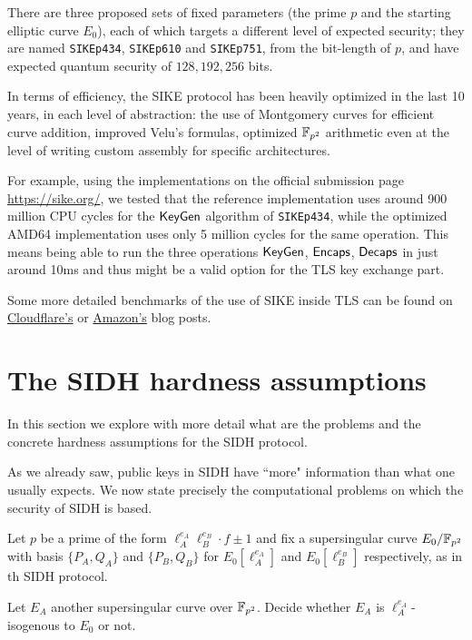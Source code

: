 There are three proposed sets of fixed parameters (the prime $p$ and the starting elliptic curve $E_0$), each of which targets a different level of expected security; they are named \texttt{SIKEp434}, \texttt{SIKEp610} and \texttt{SIKEp751}, from the bit-length of $p$, and have expected quantum security of $128, 192, 256$ bits.

In terms of efficiency, the SIKE protocol has been heavily optimized in the last 10 years, in each level of abstraction: the use of Montgomery curves for efficient curve addition, improved Velu's formulas, optimized $\mathbb{F}_{p^2}$ arithmetic even at the level of writing custom assembly for specific architectures.

For example, using the implementations on the official submission page \url{https://sike.org/},
we tested that the reference implementation uses around 900 million CPU cycles for the $\mathsf{KeyGen}$ algorithm of \texttt{SIKEp434}, while the optimized AMD64 implementation uses only 5 million cycles for the same operation. This means being able to run the three operations $\mathsf{KeyGen}$, $\mathsf{Encaps}$, $\mathsf{Decaps}$ in just around 10ms and thus might be a valid option for the TLS key exchange part.

Some more detailed benchmarks of the use of SIKE inside TLS can be found on \href{https://blog.cloudflare.com/the-tls-post-quantum-experiment/}{Cloudflare's} or \href{https://aws.amazon.com/it/blogs/security/round-2-hybrid-post-quantum-tls-benchmarks/}{Amazon's} blog posts.

\section{The SIDH hardness assumptions}
In this section we explore with more detail what are the problems and the concrete hardness assumptions for the SIDH protocol.

As we already saw, public keys in SIDH have ``more" information than what one usually expects. We now state precisely the computational problems on which the security of SIDH is based.

Let $p$ be a prime of the form $\ell_A^{e_A}\ell_B^{e_B}\cdot f\pm1$ and fix a supersingular curve $E_0/\mathbb{F}_{p^2}$ with basis $\{P_A,Q_A\}$ and $\{P_B,Q_B\}$ for $E_0[\ell_A^{e_A}]$ and $E_0[\ell_B^{e_B}]$ respectively, as in th SIDH protocol.

\begin{problem}
    Let $E_A$ another supersingular curve over $\mathbb{F}_{p^2}$. Decide whether $E_A$ is $\ell_A^{e_A}$-isogenous to $E_0$ or not.
\end{problem}

